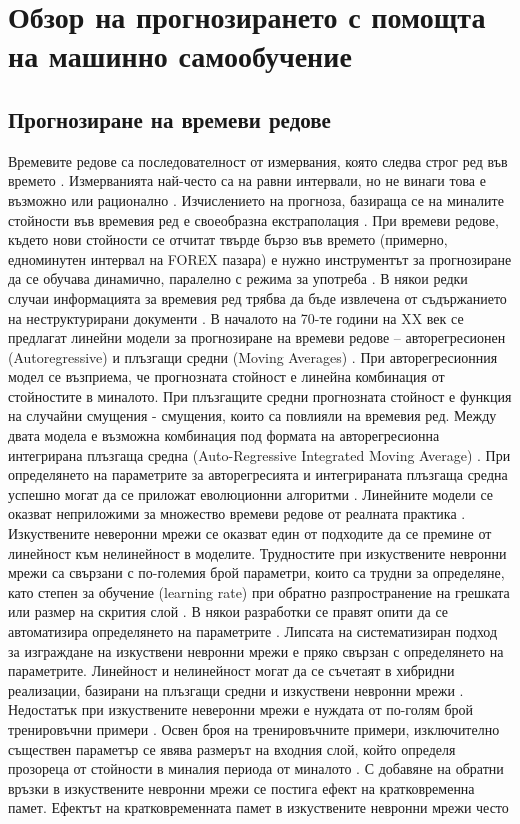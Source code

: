 ﻿\chapter{Обзор на прогнозирането с помощта на машинно самообучение}

\section{Прогнозиране на времеви редове}

Времевите редове са последователност от измервания, която следва строг ред във времето \cite{Oliveira-01}. Измерванията най-често са на равни интервали, но не винаги това е възможно или рационално \cite{Shen-01}. Изчислението на прогноза, базираща се на миналите стойности във времевия ред е своеобразна екстраполация \cite{Khashei-03}. При времеви редове, където нови стойности се отчитат твърде бързо във времето (примерно, едноминутен интервал на FOREX пазара) е нужно инструментът за прогнозиране да се обучава динамично, паралелно с режима за употреба \cite{Wagner-01}. В някои редки случаи информацията за времевия ред трябва да бъде извлечена от съдържанието на неструктурирани документи \cite{Wang-01}. В началото на 70-те години на XX век \cite{Gooijer-01} се предлагат линейни модели за прогнозиране на времеви редове – авторегресионен (Autoregressive) и плъзгащи средни (Moving Averages) \cite{Tealab-01}. При авторегресионния модел се възприема, че прогнозната стойност е линейна комбинация от стойностите в миналото. При плъзгащите средни прогнозната стойност е функция на случайни смущения - смущения, които са повлияли на времевия ред. Между двата модела е възможна комбинация под формата на авторегресионна интегрирана плъзгаща средна (Auto-Regressive Integrated Moving Average) \cite{Khashei-01}. При определянето на параметрите за авторегресията и интегрираната плъзгаща средна успешно могат да се приложат еволюционни алгоритми \cite{Cortez-01}. Линейните модели се оказват неприложими за множество времеви редове от реалната практика \cite{Bontempi-01}. Изкуствените неверонни мрежи се оказват един от подходите да се премине от линейност \cite{Zhang-03} към нелинейност в моделите. Трудностите при изкуствените невронни мрежи са свързани с по-големия брой параметри, които са трудни за определяне, като степен за обучение (learning rate) при обратно разпространение на грешката или размер на скрития слой \cite{Tang-01}. В някои разработки се правят опити да се автоматизира определянето на параметрите \cite{Yan-01}. Липсата на систематизиран подход за изграждане на изкуствени невронни мрежи \cite{Qi-01} е пряко свързан с определянето на параметрите. Линейност и нелинейност могат да се съчетаят в хибридни реализации, базирани на плъзгащи средни и изкуствени невронни мрежи \cite{Zhang-01}. Недостатък при изкуствените неверонни мрежи е нуждата от по-голям брой тренировъчни примери \cite{Lachtermacher-01}. Освен броя на тренировъчните примери, изключително съществен параметър се явява размерът на входния слой, който определя прозореца от стойности в миналия периода от миналото \cite{Chen-01}. С добавяне на обратни връзки в изкуствените невронни мрежи се постига ефект на кратковременна памет. Ефектът на кратковременната памет в изкуствените невронни мрежи често 